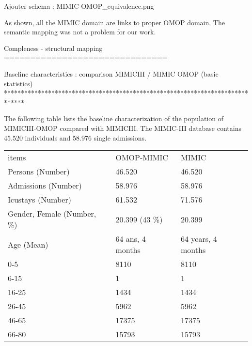 Ajouter schema : MIMIC-OMOP_equivalence.png

As shown, all the MIMIC domain are links to proper OMOP domain. 
The semantic mapping was not a problem for our work.

Compleness - structural mapping 
===============================

Baseline characteristics : comparison MIMICIII / MIMIC OMOP (basic statistics)
******************************************************************************

The following table lists the baseline characterization of the population of MIMICIII-OMOP compared with MIMICIII.
The MIMIC-III database contains 45.520 individuals and 58.976 single admissions.


\begin{table}[]
\begin{tabular}{lll}
items                                  & OMOP-MIMIC                         & MIMIC                      \\
Persons (Number)                       & 46.520                             & 46.520                     \\
Admissions (Number)                    & 58.976                             & 58.976                     \\
Icustays (Number)                      & 61.532                             & 71.576                     \\
Gender, Female (Number, \%)            & 20.399 (43 \%)                     & 20.399                     \\
Age (Mean)                             & 64 ans, 4 months                   & 64 years, 4 months         \\
0-5                                    & 8110                               & 8110                       \\
6-15                                   & 1                                  & 1                          \\
16-25                                  & 1434                               & 1434                       \\
26-45                                  & 5962                               & 5962                       \\
46-65                                  & 17375                              & 17375                      \\
66-80                                  & 15793                              & 15793                      \\

\end{tabular}
\end{table}
